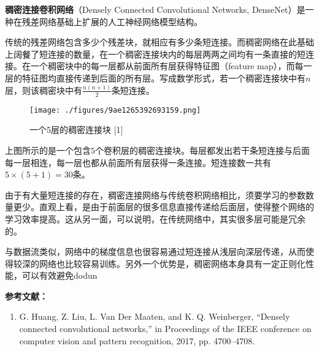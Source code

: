 
\textbf{稠密连接卷积网络}（Densely Connected Convolutional Networks, DenseNet）是一种在残差网络基础上扩展的人工神经网络模型结构。

传统的残差网络包含多少个残差块，就相应有多少条短连接。而稠密网络在此基础上阔餐了短连接的数量，在一个稠密连接块内的每层两两之间均有一条直接的短连接。在一个稠密块中的每一层都从前面所有层获得特征图（feature map），而每一层的特征图均直接传递到后面的所有层。写成数学形式，若一个稠密连接块中有$n$层，则该稠密块中有$\frac{n(n+1)}{2}$条短连接。

\begin{figure}[ht]
\centering
\texttt{[image: ./figures/9ae1265392693159.png]}
\caption{一个5层的稠密连接块 [1]} \label{fig_DensNe}
\end{figure}
上图所示的是一个包含$5$个卷积层的稠密连接块。每层都发出若干条短连接与后面每一层相连，每一层也都从前面所有层获得一条连接。短连接数一共有$5\times(5+1)=30$条。

由于有大量短连接的存在，稠密连接网络与传统卷积网络相比，须要学习的参数数量更少。直观上看，是由于前面层的很多信息直接传递给后面层，使得整个网络的学习效率提高。这从另一面，可以说明，在传统网络中，其实很多层可能是冗余的。

与数据流类似，网络中的梯度信息也很容易通过短连接从浅层向深层传递，从而使得较深的网络也比较容易训练。另外一个优势是，稠密网络本身具有一定正则化性能，可以有效避免dodun


\textbf{参考文献：}
\begin{enumerate}
\item G. Huang, Z. Liu, L. Van Der Maaten, and K. Q. Weinberger, “Densely connected convolutional networks,” in Proceedings of the IEEE conference on computer vision and pattern recognition, 2017, pp. 4700–4708.
\end{enumerate}